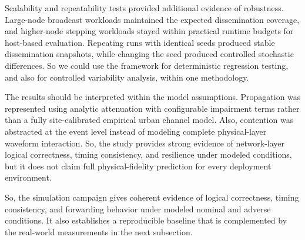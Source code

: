 Scalability and repeatability tests provided additional evidence of robustness. Large-node broadcast workloads
maintained the expected dissemination coverage, and higher-node stepping workloads stayed within practical
runtime budgets for host-based evaluation. Repeating runs with identical seeds produced stable dissemination
snapshots, while changing the seed produced controlled stochastic differences. So we could use the framework
for deterministic regression testing, and also for controlled variability analysis, within one methodology.

The results should be interpreted within the model assumptions. Propagation was represented using analytic
attenuation with configurable impairment terms rather than a fully site-calibrated empirical urban channel
model. Also, contention was abstracted at the event level instead of modeling complete physical-layer waveform
interaction. So, the study provides strong evidence of network-layer logical correctness, timing consistency,
and resilience under modeled conditions, but it does not claim full physical-fidelity prediction for every
deployment environment.

So, the simulation campaign gives coherent evidence of logical correctness, timing consistency, and
forwarding behavior under modeled nominal and adverse conditions. It also establishes a reproducible baseline
that is complemented by the real-world measurements in the next subsection.